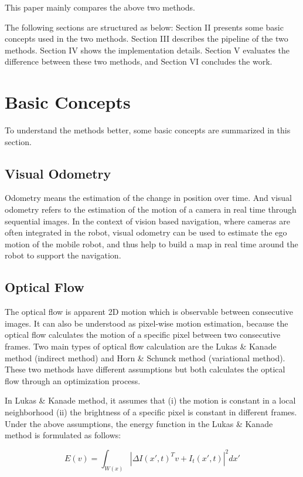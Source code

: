 \documentclass[conference]{IEEEtran}
\begin{document}
This paper mainly compares the above two methods. 

The following sections are structured as below: Section II presents some basic concepts used in the two methods. Section III describes the pipeline of the two methods. Section IV shows the implementation details. Section V evaluates the difference between these two methods, and Section VI concludes the work.


\section{Basic Concepts}
To understand the methods better, some basic concepts are summarized in this section.

\subsection{Visual Odometry}
Odometry means the estimation of the change in position over time. And visual odometry refers to the estimation of the motion of a camera in real time through sequential images. In the context of vision based navigation, where cameras are often integrated in the robot, visual odometry can be used to estimate the ego motion of the mobile robot, and thus help to build a map in real time around the robot to support the navigation.

\subsection{Optical Flow} The optical flow is apparent 2D motion which is observable between consecutive images. It can also be understood as pixel-wise motion estimation, because the optical flow calculates the motion of a specific pixel between two consecutive frames. Two main types of optical flow calculation are the Lukas \& Kanade method (indirect method) and Horn \& Schunck method (variational method). These two methods have different assumptions but both calculates the optical flow through an optimization process.

In Lukas \& Kanade method, it assumes that (i) the motion is constant in a local neighborhood (ii) the brightness of a specific pixel is constant in different frames. Under the above assumptions, the energy function in the Lukas \& Kanade method is formulated as follows:

\begin{equation}
	E(v) = \int_{W(x)} |\Delta I(x', t)^Tv + I_t(x',t) |^2dx'
\end{equation}
\end{document}
